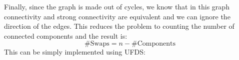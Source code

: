 Finally, since the graph is made out of cycles,  
we know that in this graph connectivity and strong connectivity 
are equivalent and we can ignore the direction of the edges. 
This reduces the problem to counting the number of connected components
and the result is:
\[
		\text{\# Swaps} = n- \text{\# Components}
\]
This can be simply implemented using UFDS:








